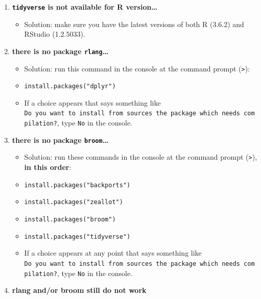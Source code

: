\documentclass[]{book}
\providecommand{\tightlist}{%
  \setlength{\itemsep}{0pt}\setlength{\parskip}{0pt}}
\begin{document}
\begin{enumerate}
\def\labelenumi{\arabic{enumi}.}
\tightlist
\item
  \textbf{\texttt{tidyverse} is not available for R version\ldots{}}

  \begin{itemize}
  \tightlist
  \item
    Solution: make sure you have the latest versions of both R (3.6.2)
    and RStudio (1.2.5033).
  \end{itemize}
\item
  \textbf{there is no package \texttt{rlang}\ldots{}}

  \begin{itemize}
  \tightlist
  \item
    Solution: run this command in the console at the command prompt
    (\texttt{\textgreater{}}):
  \item
    \texttt{install.packages("dplyr")}
  \item
    If a choice appears that says something like
    \texttt{Do\ you\ want\ to\ install\ from\ sources\ the\ package\ which\ needs\ compilation?},
    type \texttt{No} in the console.
  \end{itemize}
\item
  \textbf{there is no package \texttt{broom}\ldots{}}

  \begin{itemize}
  \tightlist
  \item
    Solution: run these commands in the console at the command prompt
    (\texttt{\textgreater{}}), \textbf{in this order}:
  \item
    \texttt{install.packages("backports")}
  \item
    \texttt{install.packages("zeallot")}
  \item
    \texttt{install.packages("broom")}
  \item
    \texttt{install.packages("tidyverse")}
  \item
    If a choice appears at any point that says something like
    \texttt{Do\ you\ want\ to\ install\ from\ sources\ the\ package\ which\ needs\ compilation?},
    type \texttt{No} in the console.
  \end{itemize}
\item
  \textbf{rlang and/or broom still do not work}


\end{enumerate}
\end{document}

